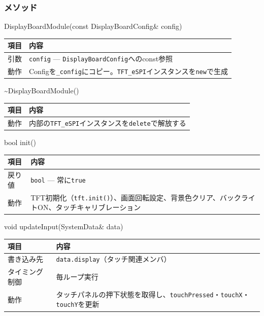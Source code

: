 \subsubsection{メソッド}

\begin{funcblock}{DisplayBoardModule(const DisplayBoardConfig\& config)}
\begin{tabularx}{\textwidth}{l X}
\toprule
\textbf{項目} & \textbf{内容} \\
\midrule
引数   & \texttt{config} --- \texttt{DisplayBoardConfig}へのconst参照 \\
動作   & Configを\texttt{\_config}にコピー。\texttt{TFT\_eSPI}インスタンスを\texttt{new}で生成 \\
\bottomrule
\end{tabularx}
\end{funcblock}

\begin{funcblock}{\textasciitilde DisplayBoardModule()}
\begin{tabularx}{\textwidth}{l X}
\toprule
\textbf{項目} & \textbf{内容} \\
\midrule
動作   & 内部の\texttt{TFT\_eSPI}インスタンスを\texttt{delete}で解放する \\
\bottomrule
\end{tabularx}
\end{funcblock}

\begin{funcblock}{bool init()}
\begin{tabularx}{\textwidth}{l X}
\toprule
\textbf{項目} & \textbf{内容} \\
\midrule
戻り値   & \texttt{bool} --- 常に\texttt{true} \\
動作     & TFT初期化（\texttt{tft.init()}）、画面回転設定、背景色クリア、バックライトON、タッチキャリブレーション \\
\bottomrule
\end{tabularx}
\end{funcblock}

\begin{funcblock}{void updateInput(SystemData\& data)}
\begin{tabularx}{\textwidth}{l X}
\toprule
\textbf{項目} & \textbf{内容} \\
\midrule
書き込み先     & \texttt{data.display}（タッチ関連メンバ） \\
タイミング制御 & 毎ループ実行 \\
動作           & タッチパネルの押下状態を取得し、\texttt{touchPressed}・\texttt{touchX}・\texttt{touchY}を更新 \\
\bottomrule
\end{tabularx}
\end{funcblock}

